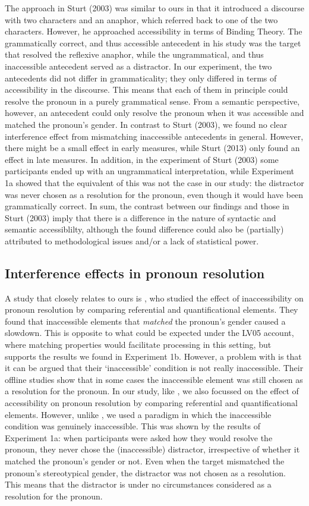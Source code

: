 \documentclass[11pt]{article} %
\begin{document}
The approach in Sturt (2003) was similar to ours in that it introduced a discourse with two characters and an anaphor, which referred back to one of the two characters. However, he approached accessibility in terms of Binding Theory. The grammatically correct, and thus accessible antecedent in his study was the target that resolved the reflexive anaphor, while the ungrammatical, and thus inaccessible antecedent served as a distractor. In our experiment, the two antecedents did not differ in grammaticality; they only differed in terms of accessibility in the discourse. This means that each of them in principle could resolve the pronoun in a purely grammatical sense. From a semantic perspective, however, an antecedent could only resolve the pronoun when it was accessible and matched the pronoun's gender. In contrast to Sturt (2003), we found no clear interference effect from mismatching inaccessible antecedents in general. However, there might be a small effect in early measures, while Sturt (2013) only found an effect in late measures. In addition, in the experiment of Sturt (2003) some participants ended up with an ungrammatical interpretation, while Experiment 1a showed that the equivalent of this was not the case in our study: the distractor was never chosen as a resolution for the pronoun, even though it would have been grammatically correct. In sum, the contrast between our findings and those in Sturt (2003) imply that there is a difference in the nature of syntactic and semantic accessiblilty, although the found difference could also be (partially) attributed to methodological issues and/or a lack of statistical power.

\subsection{Interference effects in pronoun resolution}
A study that closely relates to ours is \cite{kush+15}, who studied the effect of inaccessibility on pronoun resolution by comparing referential and quantificational elements. They found that inaccessible elements that \textit{matched} the pronoun's gender caused a slowdown. This is opposite to what could be expected under the LV05 account, where matching properties would facilitate processing in this setting, but supports the results we found in Experiment 1b. However, a problem with \cite{kush+15} is that it can be argued that their `inaccessible' condition is not really inaccessible. Their offline studies show that in some cases the inaccessible element was still chosen as a resolution for the pronoun. In our study, like \cite{kush+15}, we also focussed on the effect of accessibility on pronoun resolution by comparing referential and quantificational elements. However, unlike \cite{kush+15}, we used a paradigm in which the inaccessible condition was genuinely inaccessible. This was shown by the results of Experiment 1a: when participants were asked how they would resolve the pronoun, they never chose the (inaccessible) distractor, irrespective of whether it matched the pronoun's gender or not. Even when the target mismatched the pronoun's stereotypical gender, the distractor was not chosen as a resolution. This means that the distractor is under no circumstances considered as a resolution for the pronoun.
\end{document}

